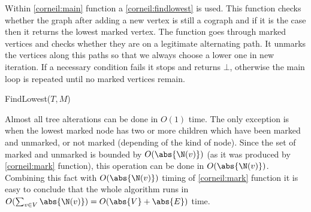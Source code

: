 Within \ref{corneil:main} function a \ref{corneil:findlowest} is used. This function checks whether the graph after adding a new vertex is still a cograph and if it is the case then it returns the lowest marked vertex. The function goes through marked vertices and checks whether they are on a legitimate alternating path. It unmarks the vertices along this paths so that we always choose a lower one in new iteration. If a necessary condition fails it stops and returns $\bot$, otherwise the main loop is repeated until no marked vertices remain.

\begin{function}
    \caption{FindLowest($T, M$)}
    \label{corneil:findlowest}
    \DontPrintSemicolon

\end{function}

Almost all tree alterations can be done in $O(1)$ time. The only exception is when the lowest marked node has two or more children which have been marked and unmarked, or not marked (depending of the kind of node). Since the set of marked and unmarked is bounded by $O(\abs{\N(v)})$ (as it was produced by \ref{corneil:mark} function), this operation can be done in $O(\abs{\N(v)})$.
Combining this fact with $O(\abs{\N(v)})$ timing of \ref{corneil:mark} function it is easy to conclude that the whole algorithm runs in $O(\sum_{v \in V} \abs{\N(v)}) = O(\abs{V} + \abs{E})$ time.

